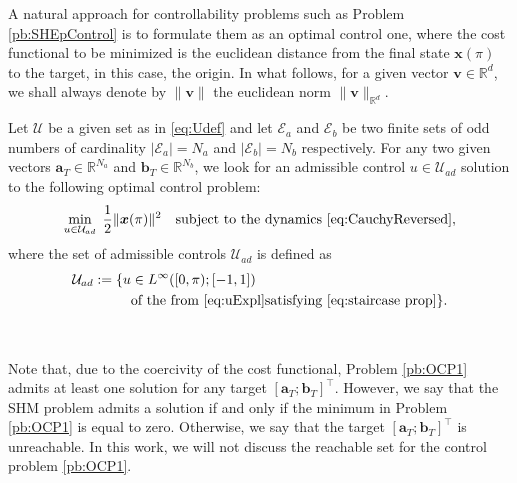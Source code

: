 \documentclass[twocolumn]{autart}    %
\begin{document}
A natural approach for controllability problems such as Problem \ref{pb:SHEpControl} is to formulate them as an optimal control one, where the cost functional to be minimized is the euclidean distance from the final state $\bm{x}(\pi)$ to the target, in this case, the origin. In what follows, for a given vector $\bm{v}\in\mathbb{R}^d$, we shall always denote by $\|\bm{v}\|$ the euclidean norm $\|\bm{v}\|_{\mathbb{R}^d}$.
\newline

\begin{problem}\label{pb:OCP1}
Let $\mathcal{U}$ be a given set as in \eqref{eq:Udef} and let $\mathcal{E}_a $ and $\mathcal{E} _b $ be two finite sets of odd numbers of cardinality $|\mathcal{E}_a| = N_a $ and $ |\mathcal{E} _b| = N_b$ respectively. For any two given vectors $\bm{a}_T \in \mathbb{R}^{N_a}$ and $\bm{b}_T \in \mathbb{R}^{N_b} $, we look for an admissible control $u\in \mathcal{U}_{ad}$ solution to the following optimal control problem:
\begin{equation*}
	\min_{u \in \mathcal{U}_{ad}}\;\frac 12 \|\bm{x}(\pi)\|^2 \quad \text{subject to the dynamics \eqref{eq:CauchyReversed}},
\end{equation*}
where the set of admissible controls $\mathcal{U}_{ad}$ is defined as
\begin{align*}
	\mathcal{U}_{ad} := \{ u&\in L^\infty ([0,\pi); [-1,1]) 
	\\ 
	&\text{of the from \eqref{eq:uExpl}} \text{satisfying \eqref{eq:staircase prop}} \}.
\end{align*}
\end{problem}


 \\


\begin{remark}
Note that, due to the coercivity of the cost functional, Problem \ref{pb:OCP1} admits at least one solution for any target $[\bm{a}_T;\bm{b}_T]^\top$. However, we say that the SHM problem admits a solution if and only if the minimum in Problem \ref{pb:OCP1} is equal to zero. Otherwise, we say that the target $[\bm{a}_T;\bm{b}_T]^\top$ is unreachable. In this work, we will not discuss the reachable set for the control problem \eqref{pb:OCP1}.
\end{remark}
\end{document}
